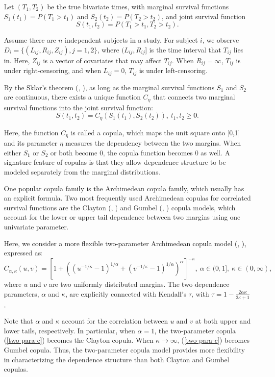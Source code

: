 Let $(T_{1},T_{2})$ be the true bivariate times, with marginal survival functions $S_{1}(t_1)=P(T_1 > t_1)$ and $S_{2}(t_2)=P(T_2 > t_2)$, and joint survival function
$$S(t_{1},t_{2})=P(T_{1} > t_{1}, T_{2} > t_{2}).$$

Assume there are $n$ independent subjects in a study. For subject $i$, we observe $D_i=\{(L_{ij},R_{ij},Z_{ij}), j = 1,2\}$, where $(L_{ij}, R_{ij}]$ is the time interval that $T_{ij}$ lies in. Here, $Z_{ij}$ is a vector of covariates that may affect $T_{ij}$. When $R_{ij} = \infty$, $T_{ij}$ is under right-censoring, and when $L_{ij} = 0$, $T_{ij}$ is under left-censoring.

By the Sklar's theorem (\citeauthor{sklar}, \citeyear{sklar}), as long as the marginal survival functions $S_1$ and $S_2$ are continuous, there exists a unique function $C_\eta$ that connects two marginal survival functions into the joint survival function:
$$S(t_1,t_2) = C_\eta(S_1(t_1),S_2(t_2)),\ t_1, t_2 \geq 0.$$

Here, the function $C_\eta$ is called a copula, which maps the unit square onto [0,1] and its parameter $\eta$ measures the dependency between the two margins. When either $S_1$ or $S_2$ or both become $0$, the copula function becomes $0$ as well. A signature feature of copulas is that they allow dependence structure to be modeled separately from the marginal distributions.

One popular copula family is the Archimedean copula family, which usually has an explicit formula. Two most frequently used Archimedean copulas for correlated survival functions are the Clayton (\citeauthor{clayton}, \citeyear{clayton}) and Gumbel (\citeauthor{gumbel}, \citeyear{gumbel}) copula models, which account for the lower or upper tail dependence between two margins using one univariate parameter.

Here, we consider a more flexible two-parameter Archimedean copula model (\citeauthor{two_param}, \citeyear{two_param}), expressed as:
\begin{equation}
C_{\alpha,\kappa}(u,v)=[1+((u^{-1/\kappa}-1)^{1/\alpha} + (v^{-1/\kappa}-1)^{1/\alpha})^{\alpha}]^{-\kappa}, \ \alpha \in (0,1], \ \kappa \in (0,\infty), \label{two-para-c}
\end{equation}
where $u$ and $v$ are two uniformly distributed margins. The two dependence parameters, $\alpha$ and $\kappa$, are explicitly connected with Kendall's $\tau$, with $\tau = 1- \frac{2\alpha\kappa}{2\kappa + 1}$.

Note that $\alpha$ and $\kappa$ account for the correlation between $u$ and $v$ at both upper and lower tails, respectively. In particular, when $\alpha = 1$, the two-parameter copula (\ref{two-para-c}) becomes the Clayton copula. When $\kappa \rightarrow \infty$, (\ref{two-para-c}) becomes Gumbel copula. Thus, the two-parameter copula model provides more flexibility in characterizing the dependence structure than both Clayton and Gumbel copulas.

